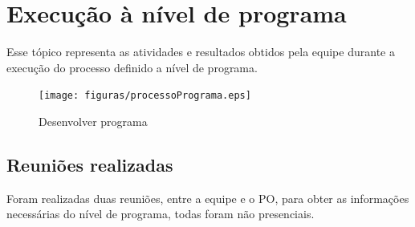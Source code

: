 \chapter[Execução à nível de programa]{Execução à nível de programa}

Esse tópico representa as atividades e resultados obtidos pela equipe durante a execução do processo definido a nível de programa.

\begin{figure}[H]
    \centering
    \caption{Desenvolver programa}
    \label{processoPrograma}
    \texttt{[image: figuras/processoPrograma.eps]}
\end{figure}
\section{Reuniões realizadas}

Foram realizadas duas reuniões, entre a equipe e o PO, para obter as informações necessárias do nível de programa, todas foram não presenciais.

